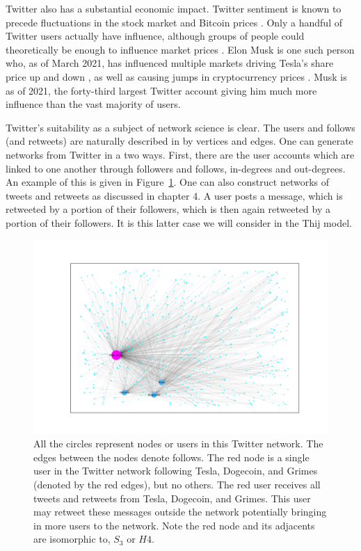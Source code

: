 Twitter also has a substantial economic impact. Twitter sentiment is known to precede fluctuations
in the stock market \cite{Bollen2011} and Bitcoin prices \cite{bitcoin}. Only a handful of Twitter users actually have influence, 
although groups of people could theoretically be enough to influence market prices \cite{stonks}.
Elon Musk is one such person who, as of March 2021, has influenced multiple markets driving Tesla's share
price up and down \cite{elontweet}, as well as causing jumps in cryptocurrency prices  \cite{elontweet2} \cite{dogecoin}. Musk 
is as of 2021, the forty-third largest Twitter account giving him much more influence than the vast majority of users.

Twitter's suitability as a subject of network science is clear. The users and follows (and retweets) are naturally 
described in by vertices and edges. One can generate networks from Twitter in a two ways.
 First, there are the user accounts which are linked to one another through 
followers and follows, in-degrees and out-degrees. An example of this is given in Figure~\ref{fig:elon_graph}. One can also construct networks
of tweets and retweets as discussed in chapter 4. A user posts a message, which is  
retweeted by a portion of their followers, which is then again retweeted by a portion of their followers.
 It is this latter case we will consider in the Thij model.

 \begin{figure}
    \centering
        \includegraphics[width=15cm]{Images/elon_graph.png}
        \caption{All the circles represent nodes or users in this Twitter network. The edges between the nodes denote follows.
         The red node is a single user in the Twitter network following Tesla, Dogecoin, and Grimes (denoted by the red edges), but no others. The 
        red user receives all tweets and retweets from Tesla, Dogecoin, and Grimes. This user may retweet these messages
        outside the network potentially bringing in more users to the network. Note the red node and its adjacents are isomorphic to, $S_3$ or $H4$. \label{fig:elon_graph}}
\end{figure}


